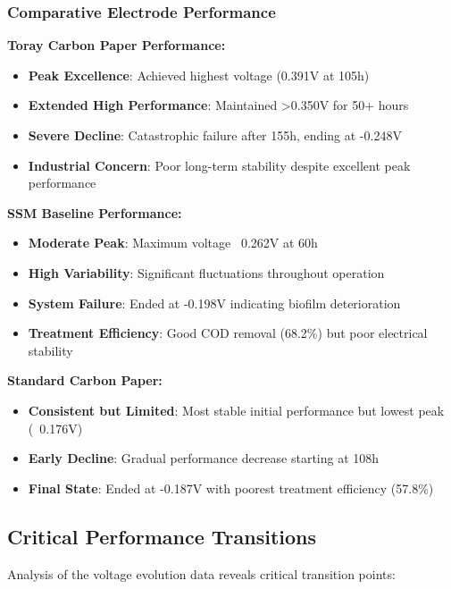 \documentclass[12pt,a4paper]{article}
\begin{document}
\subsubsection{Comparative Electrode Performance}

\textbf{Toray Carbon Paper Performance:}
\begin{itemize}
    \item \textbf{Peak Excellence}: Achieved highest voltage (0.391V at 105h)
    \item \textbf{Extended High Performance}: Maintained >0.350V for 50+ hours
    \item \textbf{Severe Decline}: Catastrophic failure after 155h, ending at -0.248V
    \item \textbf{Industrial Concern}: Poor long-term stability despite excellent peak performance
\end{itemize}

\textbf{SSM Baseline Performance:}
\begin{itemize}
    \item \textbf{Moderate Peak}: Maximum voltage ~0.262V at 60h
    \item \textbf{High Variability}: Significant fluctuations throughout operation
    \item \textbf{System Failure}: Ended at -0.198V indicating biofilm deterioration
    \item \textbf{Treatment Efficiency}: Good COD removal (68.2\%) but poor electrical stability
\end{itemize}

\textbf{Standard Carbon Paper:}
\begin{itemize}
    \item \textbf{Consistent but Limited}: Most stable initial performance but lowest peak (~0.176V)
    \item \textbf{Early Decline}: Gradual performance decrease starting at 108h
    \item \textbf{Final State}: Ended at -0.187V with poorest treatment efficiency (57.8\%)
\end{itemize}

\subsection{Critical Performance Transitions}

Analysis of the voltage evolution data reveals critical transition points:
\end{document}
